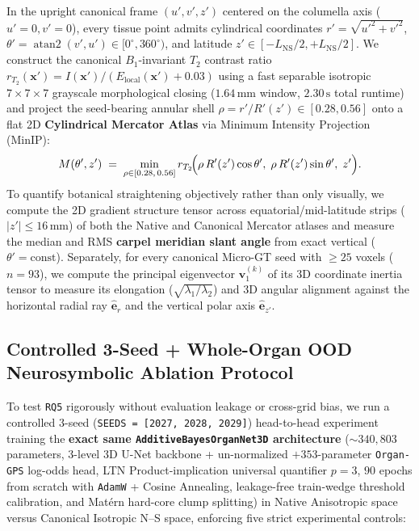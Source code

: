 \documentclass[10pt,a4paper]{article}
\renewcommand{\_}{\origunderscore\allowbreak}
\begin{document}
In the upright canonical frame $(u', v', z')$ centered on the columella axis ($u'=0, v'=0$), every tissue point admits cylindrical coordinates $r' = \sqrt{u'^2 + v'^2}$, $\theta' = \operatorname{atan2}(v', u') \in [0^\circ, 360^\circ)$, and latitude $z' \in [-L_{\text{NS}}/2, +L_{\text{NS}}/2]$. We construct the canonical $B_1$-invariant $T_2$ contrast ratio $r_{T_2}(\mathbf{x}') = I(\mathbf{x}') / (E_{\text{local}}(\mathbf{x}') + 0.03)$ using a fast separable isotropic $7\times 7\times 7$ grayscale morphological closing ($1.64\,\text{mm}$ window, $2.30\,\text{s}$ total runtime) and project the seed-bearing annular shell $\rho = r'/R'(z') \in [0.28, 0.56]$ onto a flat 2D \textbf{Cylindrical Mercator Atlas} via Minimum Intensity Projection (MinIP):
\begin{equation}
    M(\theta', z') \;=\; \min_{\rho \in [0.28,\, 0.56]} r_{T_2}\!\Bigl(\rho\,R'(z')\cos\theta',\; \rho\,R'(z')\sin\theta',\; z'\Bigr).
    \label{eq:mercator}
\end{equation}
To quantify botanical straightening objectively rather than only visually, we compute the 2D gradient structure tensor across equatorial/mid-latitude strips ($|z'| \le 16\,\text{mm}$) of both the Native and Canonical Mercator atlases and measure the median and RMS \textbf{carpel meridian slant angle} from exact vertical ($\theta' = \text{const}$). Separately, for every canonical Micro-GT seed with $\ge 25$ voxels ($n=93$), we compute the principal eigenvector $\mathbf{v}_1^{(k)}$ of its 3D coordinate inertia tensor to measure its elongation ($\sqrt{\lambda_1/\lambda_2}$) and 3D angular alignment against the horizontal radial ray $\hat{\mathbf{e}}_r$ and the vertical polar axis $\hat{\mathbf{e}}_{z'}$.

\subsection{Controlled 3-Seed + Whole-Organ OOD Neurosymbolic Ablation Protocol}
\label{sec:meth_ablation}

To test \texttt{RQ5} rigorously without evaluation leakage or cross-grid bias, we run a controlled $3$-seed (\texttt{SEEDS = [2027, 2028, 2029]}) head-to-head experiment training the \textbf{exact same \texttt{AdditiveBayesOrganNet3D} architecture} ($\sim 340{,}803$ parameters, 3-level 3D U-Net backbone + un-normalized $+353$-parameter \texttt{Organ-GPS} log-odds head, LTN Product-implication universal quantifier $p=3$, $90$ epochs from scratch with \texttt{AdamW} + Cosine Annealing, leakage-free train-wedge threshold calibration, and Mat\'ern hard-core clump splitting) in Native Anisotropic space versus Canonical Isotropic N--S space, enforcing five strict experimental controls:
\end{document}
